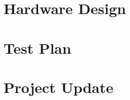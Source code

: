 \documentclass[11pt,letterpaper]{article}
\let\Oldsection\section
\renewcommand{\section}{\FloatBarrier\Oldsection}
\begin{document}
\section{Hardware Design}
\label{sec:hardware-design}

\clearpage

\section{Test Plan}
\label{sec:test-plan}

\clearpage

\section{Project Update}
\label{sec:project-update}

\clearpage

%
\end{document}
